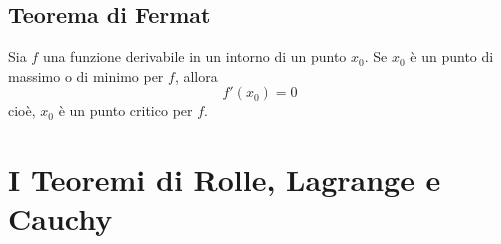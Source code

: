 \documentclass{book}
\begin{document}
\begin{minipage}{\textwidth}
    \begin{theorem}
        \subsection{Teorema di Fermat}
        Sia \( f \) una funzione derivabile in un intorno di un punto \( x_0 \). Se \( x_0 \) è un punto di massimo o di minimo per \( f \), allora
        \[f'(x_0)=0\]
        cioè, \( x_0 \) è un punto critico per \( f \).
    \end{theorem}
\end{minipage}

\noindent\begin{minipage}{\textwidth}
    \section{I Teoremi di Rolle, Lagrange e Cauchy}
    \begin{theorem}

\end{theorem}
\end{minipage}
\end{document}
